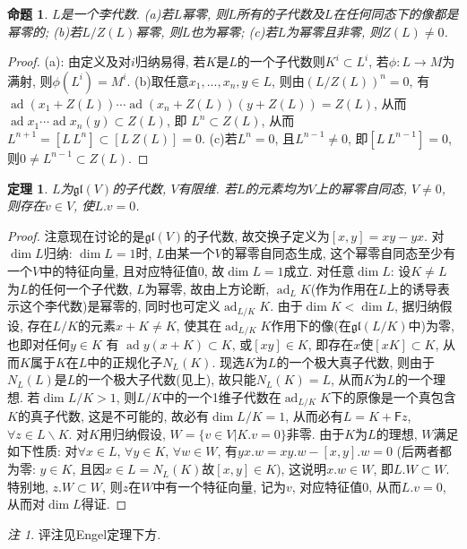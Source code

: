 \documentclass{ctexart}%
\newtheorem{theorem}{定理}
\newtheorem{proposition}{命题}
\theoremstyle{definition}
\theoremstyle{remark}
\newtheorem{remark}{注}
\DeclareMathOperator{\ad}{ad}
\begin{document}
\begin{proposition}\label{3.2}$L$是一个李代数. (a)若$L$幂零, 则$L$所有的子代数及$L$在任何同态下的像都是幂零的; (b)若$L/Z(L)$幂零, 则$L$也为幂零; (c)若$L$为幂零且非零, 则$Z(L)\neq0$.
\end{proposition}
\begin{proof}
(a): 由定义及对$i$归纳易得, 若$K$是$L$的一个子代数则$K^i\subset L^i$, 若$\phi\colon L\rightarrow M$为满射, 则$\phi(L^i)= M^i$. (b)取任意$x_1,...,x_n,y\in L$, 则由$(L/Z(L))^n=0$, 有$\ad (x_1+Z(L))\cdots \ad (x_n+Z(L))(y+Z(L)) = Z(L)$, 从而 $\ad x_1\cdots \ad x_n(y) \subset Z(L)$, 即 $L^n \subset Z(L)$, 从而$L^{n+1}=[L\,L^n]\subset [L\,Z(L)]=0$. (c)若$L^n=0$, 且$L^{n-1}\neq 0$, 即$[L\, L^{n-1}]=0$, 则$0\neq L^{n-1}\subset Z(L)$.
\end{proof}

\begin{theorem}\label{3.3}$L$为$\mathfrak{gl}(V)$的子代数, $V$有限维. 若$L$的元素均为$V$上的幂零自同态, $V\neq 0$, 则存在$v\in V$, 使$L.v=0$.
\end{theorem}
\begin{proof}
注意现在讨论的是$\mathfrak{gl}(V)$的子代数, 故交换子定义为$[x,y]=xy-yx$. 对$\dim L$归纳: $\dim L = 1$时, $L$由某一个$V$的幂零自同态生成, 这个幂零自同态至少有一个$V$中的特征向量, 且对应特征值0, 故$\dim L = 1$成立. 对任意$\dim L$: 设$K\neq L$为$L$的任何一个子代数, $L$为幂零, 故由上方论断, $\ad_LK$(作为作用在$L$上的诱导表示这个李代数)是幂零的, 同时也可定义$\ad_{L/K}K$. 由于$\dim K <\dim L$, 据归纳假设, 存在$L/K$的元素$x+K\neq K$, 使其在$\ad_{L/K}K$作用下的像(在$\mathfrak{gl}(L/K)$中)为零, 也即对任何$y\in K$ 有 $\ad y (x+K) \subset K$, 或$[xy]\in K$, 即存在$x$使$[xK]\subset K$, 从而$K$属于$K$在$L$中的正规化子$N_L(K)$. 现选$K$为$L$的一个极大真子代数, 则由于$N_L(L)$是$L$的一个极大子代数(见上), 故只能$N_L(K)=L$, 从而$K$为$L$的一个理想. 若$\dim L/K >1$, 则$L/K$中的一个1维子代数在$\ad_{L/K}K$下的原像是一个真包含$K$的真子代数, 这是不可能的, 故必有$\dim L/K=1$, 从而必有$L=K+\mathsf{F}z$, $\forall z\in L\backslash K$. 对$K$用归纳假设, $W=\{v\in V|K.v=0\}$非零. 由于$K$为$L$的理想, $W$满足如下性质: 对$\forall x\in L$, $\forall y\in K$, $\forall w\in W$, 有$yx.w=xy.w-[x,y].w=0$ (后两者都为零: $y\in K$, 且因$x\in L= N_L(K)$故$[x,y]\in K$), 这说明$x.w\in W$, 即$L.W\subset W$. 特别地, $z.W\subset W$, 则$z$在$W$中有一个特征向量, 记为$v$, 对应特征值0, 从而$L.v=0$, 从而对$\dim L$得证.
\end{proof}
\begin{remark}
评注见Engel定理下方.
\end{remark}
\end{document}

